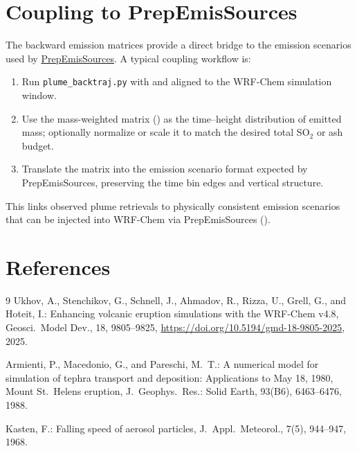 \documentclass[11pt]{article}
\begin{document}
\section{Coupling to PrepEmisSources}
The backward emission matrices provide a direct bridge to the emission scenarios
used by \href{https://github.com/saneku/PrepEmisSources}{PrepEmisSources}. A
typical coupling workflow is:
\begin{enumerate}
  \item Run \texttt{plume\_backtraj.py} with  and
         aligned to the WRF-Chem simulation window.
  \item Use the mass-weighted matrix () as the
        time--height distribution of emitted mass; optionally normalize or scale
        it to match the desired total SO$_2$ or ash budget.
  \item Translate the matrix into the emission scenario format expected by
        PrepEmisSources, preserving the time bin edges and vertical structure.
\end{enumerate}
This links observed plume retrievals to physically consistent emission scenarios
that can be injected into WRF-Chem via PrepEmisSources
(\cite{Ukhov2025PrepEmis}).

\section{References}
\begin{thebibliography}{9}
Ukhov, A., Stenchikov, G., Schnell, J., Ahmadov, R., Rizza, U., Grell, G., and
Hoteit, I.: Enhancing volcanic eruption simulations with the WRF-Chem v4.8,
Geosci.\ Model Dev., 18, 9805--9825,
\href{https://doi.org/10.5194/gmd-18-9805-2025}{https://doi.org/10.5194/gmd-18-9805-2025},
2025.

Armienti, P., Macedonio, G., and Pareschi, M.\ T.: A numerical model for
simulation of tephra transport and deposition: Applications to May 18, 1980,
Mount St.\ Helens eruption, J.\ Geophys.\ Res.: Solid Earth, 93(B6), 6463--6476,
1988.

Kasten, F.: Falling speed of aerosol particles, J.\ Appl.\ Meteorol., 7(5),
944--947, 1968.
\end{thebibliography}
\end{document}
